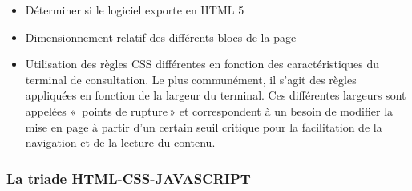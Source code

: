 {\begin{itemize}
\begin{itemize}
 \item Déterminer si le logiciel exporte en HTML 5
 \item Dimensionnement relatif des différents blocs de la page
\item  Utilisation des règles CSS différentes en fonction des caractéristiques du terminal de consultation. Le plus communément, il s'agit des règles appliquées en fonction de la largeur du terminal. Ces différentes largeurs sont appelées « \,points de rupture\,» et correspondent à un besoin de modifier la mise en page à partir d'un certain seuil critique pour la facilitation de la navigation et de la lecture du contenu.
\end{itemize} 
\end{itemize} 

}
\subsubsection{La triade HTML-CSS-JAVASCRIPT \citep {durant_html_2014}}
